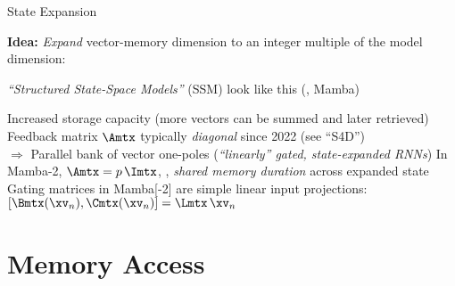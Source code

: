 \begin{slide}[\slideopts]{State Expansion}

\vspace{-1em}

  \textbf{Idea:} \emph{Expand} vector-memory dimension to an integer multiple of the model dimension:
%


\vspace{-1em}

\maybepause

\emph{``Structured State-Space Models''} (SSM) look like this (\eg, Mamba)
\begin{itemize}
  \mpitem Increased storage capacity (more vectors can be summed and later retrieved)
  \mpitem Feedback matrix $\Amtx$ typically \emph{diagonal} since 2022 (see ``S4D'')\\
  	  \maybepause $\Rightarrow$ Parallel bank of vector one-poles (\emph{``linearly'' gated, state-expanded RNNs})
  \mpitem In Mamba-2, $\Amtx = p\,\Imtx$, \ie, \emph{shared memory duration} across expanded state
  \mpitem Gating matrices in Mamba[-2] are simple linear input projections:
  $
          [\Bmtx(\xv_n), \Cmtx(\xv_n)] = \Lmtx\,\xv_n  %
  $
\end{itemize}

\end{slide}

\section[\sectopts,toc={Processing}]{Memory Access}

